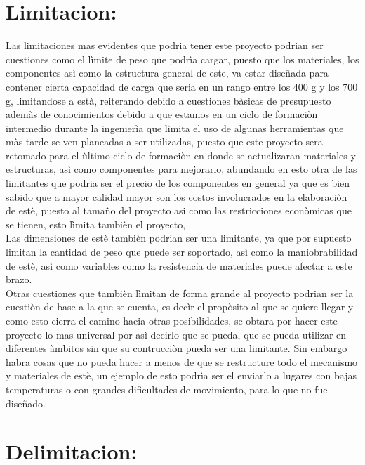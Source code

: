 \documentclass[14pt,a4paper]{article}
\begin{document}
\section{Limitacion:}
Las limitaciones mas evidentes que podria tener este proyecto podrian ser cuestiones como el lìmite de peso que podrìa cargar, puesto que los materiales, los componentes asì como la estructura general de este, va estar diseñada para contener cierta capacidad de carga que seria en un rango entre los 400 g y los 700 g, limitandose a està, reiterando debido a cuestiones bàsicas de presupuesto ademàs de conocimientos debido a que estamos en un ciclo de formaciòn intermedio durante la ingenierìa que lìmita el uso de algunas herramientas que màs tarde se ven planeadas a ser utilizadas, puesto que este proyecto sera retomado para el ùltimo ciclo de formaciòn en donde se actualizaran materiales y estructuras, asì como componentes para mejorarlo, abundando en esto otra de las limitantes que podria ser el precio de los componentes en general ya que es bien sabido que a mayor calidad mayor son los costos involucrados en la elaboraciòn de estè, puesto al tamaño del proyecto asi como las restricciones econòmicas que se tienen, esto lìmita tambièn el proyecto,\\
Las dimensiones de estè tambièn podrian ser una limitante, ya que por supuesto limitan la cantidad de peso que puede ser soportado, asì como la maniobrabilidad de estè, asì como variables como la resistencia de materiales puede afectar a este brazo.\\
Otras cuestiones que tambièn lìmitan de forma grande al proyecto podrian ser la cuestiòn de base a la que se cuenta, es decìr el propòsito al que se quiere llegar y como esto cierra el camino hacia otras posibilidades, se obtara por hacer este proyecto lo mas universal por asì decirlo que se pueda, que se pueda utilizar en diferentes àmbitos sin que su contrucciòn pueda ser una limitante. Sin embargo habra cosas que no pueda hacer a menos de que se restructure todo el mecanismo y materiales  de estè, un ejemplo de esto podrìa ser el enviarlo a lugares con bajas temperaturas o con grandes dificultades de movimiento, para lo que no fue diseñado.

\section{Delimitacion:}
\end{document}
